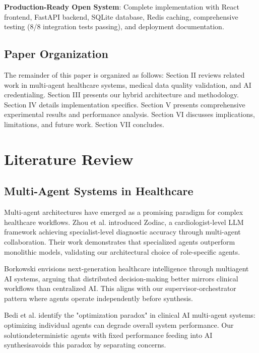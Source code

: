 \documentclass[conference]{IEEEtran}
\begin{document}
\textbf{Production-Ready Open System}: Complete implementation with React frontend, FastAPI backend, SQLite database, Redis caching, comprehensive testing (8/8 integration tests passing), and deployment documentation.

\subsection{Paper Organization}

The remainder of this paper is organized as follows: Section II reviews related work in multi-agent healthcare systems, medical data quality validation, and AI credentialing. Section III presents our hybrid architecture and methodology. Section IV details implementation specifics. Section V presents comprehensive experimental results and performance analysis. Section VI discusses implications, limitations, and future work. Section VII concludes.

\section{Literature Review}

\subsection{Multi-Agent Systems in Healthcare}

Multi-agent architectures have emerged as a promising paradigm for complex healthcare workflows. Zhou et al. \cite{zhou2024zodiac} introduced Zodiac, a cardiologist-level LLM framework achieving specialist-level diagnostic accuracy through multi-agent collaboration. Their work demonstrates that specialized agents outperform monolithic models, validating our architectural choice of role-specific agents.

Borkowski \cite{borkowski2025multiagent} envisions next-generation healthcare intelligence through multiagent AI systems, arguing that distributed decision-making better mirrors clinical workflows than centralized AI. This aligns with our supervisor-orchestrator pattern where agents operate independently before synthesis.

Bedi et al. \cite{bedi2025optimization} identify the "optimization paradox" in clinical AI multi-agent systems: optimizing individual agents can degrade overall system performance. Our solutiondeterministic agents with fixed performance feeding into AI synthesisavoids this paradox by separating concerns.
\end{document}
